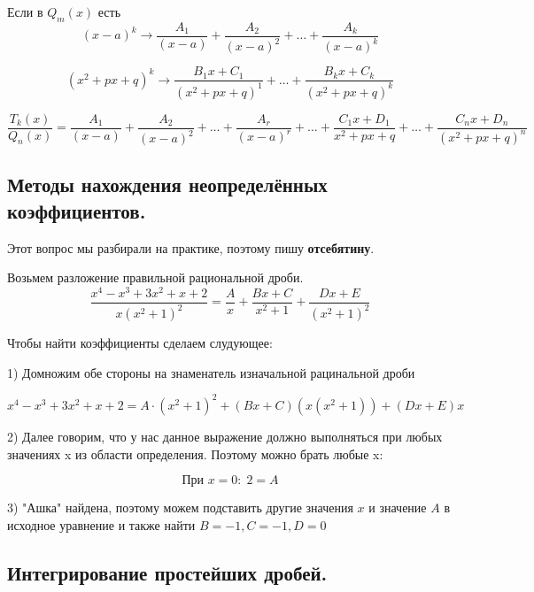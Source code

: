 \documentclass[a4paper,12pt]{article}
\theoremstyle{plain} %
\theoremstyle{definition} %
\theoremstyle{remark} %
\begin{document}
Если в $Q_m(x)$ есть
\[(x-a)^k \rightarrow \frac{A_1}{(x - a)} + \frac{A_2}{(x - a)^2} + \dots + \frac{A_k}{(x - a)^k} \]

\[ (x^2 + px + q)^k \rightarrow \frac{B_1 x+C_1}{(x^2 + px + q)^1} + \dots + \frac{B_k x+C_k}{(x^2 + px + q)^k}  \]


\[
	\frac{T_k(x)}{Q_n(x)} = \frac{A_1}{(x - a)} + \frac{A_2}{(x - a)^2} + \dots + \frac{A_r}{(x - a)^r} + \dots + \frac{C_1 x + D_1}{x^2 + px + q} + \dots + \frac{C_n x + D_n}{(x^2 + px + q)^n}
\]


\newpage
\subsection*{Методы нахождения неопределённых коэффициентов.}

Этот вопрос мы разбирали на практике, поэтому пишу \textbf{отсебятину}.

Возьмем разложение правильной рациональной дроби.
\[
	\frac{x^4 - x^3 + 3x^2 + x + 2}{x(x^2 + 1)^2} = \frac{A}{x} + \frac{Bx + C}{x^2 + 1} + \frac{Dx + E}{(x^2 + 1)^2}
\]

Чтобы найти коэффициенты сделаем слудующее:

1) Домножим обе стороны на знаменатель изначальной рацинальной дроби

\[
	x^4 - x^3 + 3x^2 + x + 2 = A\cdot (x^2 + 1)^2 + (Bx + C)(x(x^2 + 1)) + (Dx + E)x
\]

2) Далее говорим, что у нас данное выражение должно выполняться при любых значениях x из области определения. Поэтому можно брать любые x:

\[
	\text{При } x = 0: \; 2 = A
\]

3) "Ашка" найдена, поэтому можем подставить другие значения $x$ и значение $A$ в исходное уравнение и также найти $B = -1, C = -1, D = 0$


\newpage
\subsection*{Интегрирование простейших дробей.}
\end{document}
